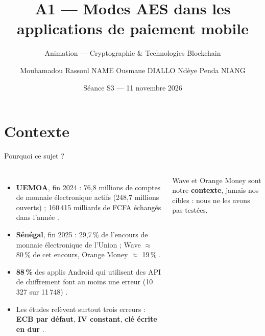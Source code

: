 \documentclass[aspectratio=169,10pt]{beamer}
\title{A1 --- Modes AES dans les applications de paiement mobile}
\subtitle{Animation --- Cryptographie \& Technologies Blockchain}
\author{Mouhamadou Rassoul NAME \quad Ousmane DIALLO \quad Ndèye Penda NIANG}
\date{Séance S3 --- 11 novembre 2026}
\institute{École Supérieure Polytechnique, UCAD --- Laboratoire LITA\\
           Discutants : groupe 4 \quad Rapporteurs : groupe 3}
\begin{document}
\begin{frame}[plain]
  \titlepage
\end{frame}

\section{Contexte}

\begin{frame}{Pourquoi ce sujet ?}
  \begin{columns}[T]
    \begin{itemize}
      \item \textbf{UEMOA}, fin 2024 : \alert{76,8 millions} de comptes de monnaie électronique actifs (248,7 millions ouverts) ;
            \alert{160\,415 milliards de FCFA} échangés dans l'année \cite{bceao2024}.
      \item \textbf{Sénégal}, fin 2025 : 29,7\,\% de l'encours de monnaie électronique de l'Union ; Wave $\approx$ 80\,\% de cet encours, Orange Money $\approx$ 19\,\% \cite{cbumoa2025}.
      \item \textbf{88\,\%} des applis Android qui utilisent des API de chiffrement font au moins une erreur
            (10\,327 sur 11\,748) \cite{egele2013}.
      \item Les études relèvent surtout trois erreurs : \textbf{ECB par défaut}, \textbf{IV constant}, \textbf{clé écrite en dur} \cite{egele2013, rahaman2019}.
    \end{itemize}
    \vspace{0.2em}
    \scriptsize Wave et Orange Money sont notre \textbf{contexte}, jamais nos cibles : nous ne les avons pas testées.
    \centering
  \end{columns}
\end{frame}
\end{document}
